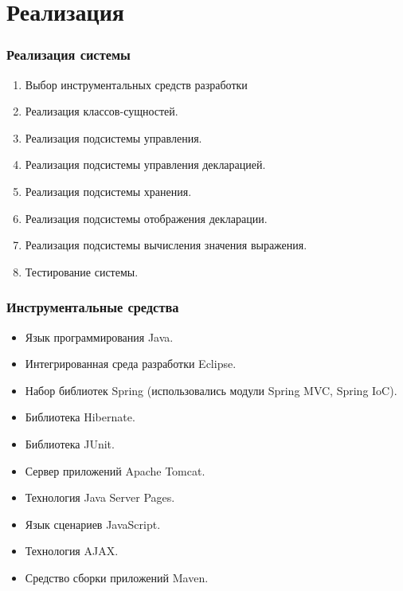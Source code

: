 \documentclass[xcolor=pdftex, dvipsnames, table]{beamer}
\begin{document}
\section{Реализация}
\begin{frame}
  \frametitle{Реализация системы}
  \begin{enumerate}
    \item Выбор инструментальных средств разработки
    \item Реализация классов-сущностей.
    \item Реализация подсистемы управления.
    \item Реализация подсистемы управления декларацией.
    \item Реализация подсистемы хранения.
    \item Реализация подсистемы отображения декларации.
    \item Реализация подсистемы вычисления значения выражения.
    \item Тестирование системы.
  \end{enumerate}
\end{frame}
\begin{frame}
  \frametitle{Инструментальные средства}
  \begin{itemize}
    \item Язык программирования Java.
    \item Интегрированная среда разработки Eclipse.
    \item Набор библиотек Spring (использовались модули Spring MVC, Spring IoC).
    \item Библиотека Hibernate.
    \item Библиотека JUnit.
    \item Сервер приложений Apache Tomcat.
    \item Технология Java Server Pages.
    \item Язык сценариев JavaScript.
    \item Технология AJAX.
    \item Средство сборки приложений Maven.
  \end{itemize}
\end{frame}
\end{document}
